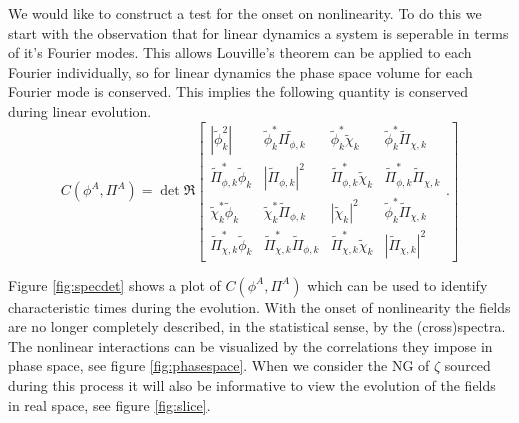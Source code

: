 We would like to construct a test for the onset on nonlinearity.
To do this we start with the observation that for linear dynamics a system is seperable in terms of it's Fourier modes.
This allows Louville's theorem can be applied to each Fourier individually, so for linear dynamics the phase space volume for each Fourier mode is conserved.
This implies the following quantity is conserved during linear evolution.
\begin{equation}
  C(\phi^A,\Pi^A) =
  \det\Re\left[
    \begin{matrix}
      |\tilde{\phi}_k^2| & \tilde{\phi}_k^*\tilde{\Pi_{\phi, k}} & \tilde{\phi}_k^*\tilde{\chi}_k & \tilde{\phi}_k^*\tilde{\Pi}_{\chi, k} \\
      \tilde{\Pi}_{\phi,k}^*\tilde{\phi}_k & |\tilde{\Pi}_{\phi, k}|^2 & \tilde{\Pi}_{\phi,k}^*\tilde{\chi}_k & \tilde{\Pi}_{\phi,k}^*\tilde{\Pi}_{\chi, k} \\
      \tilde{\chi}_k^*\tilde{\phi}_k & \tilde{\chi}_k^*\tilde{\Pi}_{\phi, k} & |\tilde{\chi}_k|^2 & \tilde{\phi}_k^*\tilde{\Pi}_{\chi, k} \\
      \tilde{\Pi}_{\chi,k}^*\tilde{\phi}_k & \tilde{\Pi}_{\chi, k}^*\tilde{\Pi}_{\phi, k} & \tilde{\Pi}_{\chi,k}^*\tilde{\chi}_k & |\tilde{\Pi}_{\chi, k}|^2
    \end{matrix}.
  \right]
\end{equation}

Figure \ref{fig:specdet} shows a plot of $C(\phi^A,\Pi^A)$ which can be used to identify characteristic times during the evolution.
With the onset of nonlinearity the fields are no longer completely described, in the statistical sense, by the (cross)spectra.
The nonlinear interactions can be visualized by the correlations they impose in phase space, see figure \ref{fig:phasespace}.
When we consider the NG of $\zeta$ sourced during this process it will also be informative to view the evolution of the fields in real space, see figure \ref{fig:slice}.

